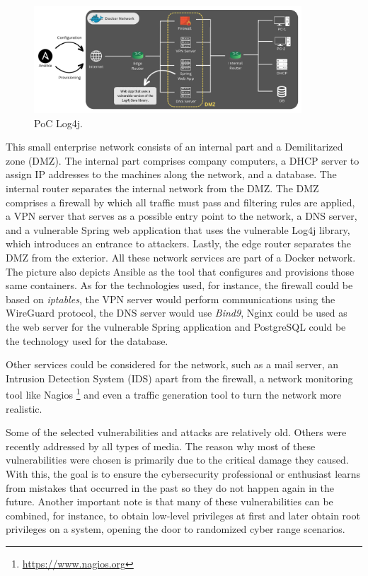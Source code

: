 \begin{figure}[H]
    \includegraphics[width=10cm]{figures/poc_log4j.png}
    \caption{PoC Log4j.}
    \label{fig:poc_log4j}
\end{figure}

This small enterprise network consists of an internal part and a Demilitarized zone (DMZ). The internal part comprises company computers, a DHCP server to assign IP addresses to the machines along the network, and a database. The internal router separates the internal network from the DMZ. The DMZ comprises a firewall by which all traffic must pass and filtering rules are applied, a VPN server that serves as a possible entry point to the network, a DNS server, and a vulnerable Spring web application that uses the vulnerable Log4j library, which introduces an entrance to attackers. Lastly, the edge router separates the DMZ from the exterior. All these network services are part of a Docker network. The picture also depicts Ansible as the tool that configures and provisions those same containers. As for the technologies used, for instance, the firewall could be based on \textit{iptables}, the VPN server would perform communications using the WireGuard protocol, the DNS server would use \textit{Bind9}, Nginx could be used as the web server for the vulnerable Spring application and PostgreSQL could be the technology used for the database.

Other services could be considered for the network, such as a mail server, an Intrusion Detection System (IDS) apart from the firewall, a network monitoring tool like Nagios \footnote{\url{https://www.nagios.org}} and even a traffic generation tool to turn the network more realistic. 

Some of the selected vulnerabilities and attacks are relatively old. Others were recently addressed by all types of media. The reason why most of these vulnerabilities were chosen is primarily due to the critical damage they caused. With this, the goal is to ensure the cybersecurity professional or enthusiast learns from mistakes that occurred in the past so they do not happen again in the future. Another important note is that many of these vulnerabilities can be combined, for instance, to obtain low-level privileges at first and later obtain root privileges on a system, opening the door to randomized cyber range scenarios.


